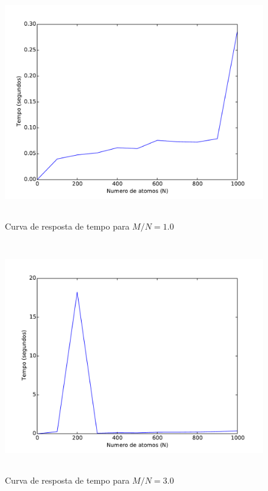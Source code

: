 		\begin{figure}[H]
			\centering
			\includegraphics[height=10cm]{images/max2sat_mn10}
			\caption{Curva de resposta de tempo para $M/N=1.0$}
			\label{fig:max2satmn10}
		\end{figure}
		
		\begin{figure}[H]
			\centering
			\includegraphics[height=10cm]{images/max2sat_mn30}
			\caption{Curva de resposta de tempo para $M/N=3.0$}
			\label{fig:max2satmn30}
		\end{figure}
		
